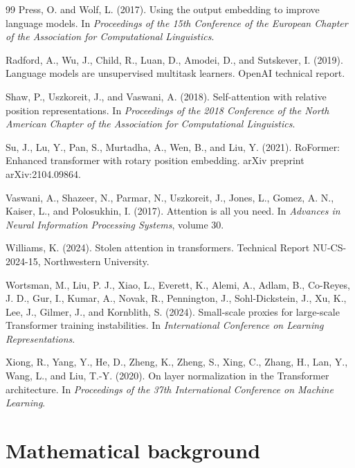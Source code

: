 \documentclass[11pt]{article}
\begin{document}
\begin{thebibliography}{99}
Press, O. and Wolf, L. (2017).
Using the output embedding to improve language models.
In \emph{Proceedings of the 15th Conference of the European Chapter of the Association for Computational Linguistics}.

Radford, A., Wu, J., Child, R., Luan, D., Amodei, D., and Sutskever, I. (2019).
Language models are unsupervised multitask learners.
OpenAI technical report.

Shaw, P., Uszkoreit, J., and Vaswani, A. (2018).
Self-attention with relative position representations.
In \emph{Proceedings of the 2018 Conference of the North American Chapter of the Association for Computational Linguistics}.

Su, J., Lu, Y., Pan, S., Murtadha, A., Wen, B., and Liu, Y. (2021).
RoFormer: Enhanced transformer with rotary position embedding.
arXiv preprint arXiv:2104.09864.

Vaswani, A., Shazeer, N., Parmar, N., Uszkoreit, J., Jones, L., Gomez, A. N., Kaiser, L., and Polosukhin, I. (2017).
Attention is all you need.
In \emph{Advances in Neural Information Processing Systems}, volume 30.

Williams, K. (2024).
Stolen attention in transformers.
Technical Report NU-CS-2024-15, Northwestern University.

Wortsman, M., Liu, P. J., Xiao, L., Everett, K., Alemi, A., Adlam, B., Co-Reyes, J. D., Gur, I., Kumar, A., Novak, R., Pennington, J., Sohl-Dickstein, J., Xu, K., Lee, J., Gilmer, J., and Kornblith, S. (2024).
Small-scale proxies for large-scale Transformer training instabilities.
In \emph{International Conference on Learning Representations}.

Xiong, R., Yang, Y., He, D., Zheng, K., Zheng, S., Xing, C., Zhang, H., Lan, Y., Wang, L., and Liu, T.-Y. (2020).
On layer normalization in the Transformer architecture.
In \emph{Proceedings of the 37th International Conference on Machine Learning}.
\end{thebibliography}

\appendix

\section{Mathematical background}\label{app:math}
\end{document}
